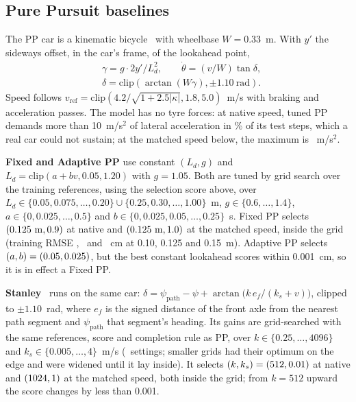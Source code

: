 \documentclass{IJCAS}
\begin{document}
\subsection{Pure Pursuit baselines}\label{sec:rlpp}
The PP car is a kinematic bicycle~\cite{rajamani2012} with wheelbase $W=0.33$~m. With $y'$ the sideways offset, in the car's frame, of the lookahead point,
\begin{equation}
\begin{aligned}
&\gamma=g\cdot2y'/L_d^2,\qquad \dot\theta=(v/W)\tan\delta,\\
&\delta=\mathrm{clip}(\arctan(W\gamma),\pm1.10~\mathrm{rad}).
\end{aligned}\label{eq:pp}
\end{equation}
Speed follows $v_{\mathrm{ref}}=\mathrm{clip}(4.2/\sqrt{1+2.5|\kappa|},1.8,5.0)$~m/s with braking and acceleration passes. The model has no tyre forces: at native speed, tuned PP demands more than 10~m/s$^2$ of lateral acceleration in \VlatAccFrac\% of its test steps, which a real car could not sustain; at the matched speed below, the maximum is \VlatAccMaxM~m/s$^2$.

\textbf{Fixed and Adaptive PP} use constant $(L_d,g)$ and $L_d=\mathrm{clip}(a+bv,0.05,1.20)$ with $g=1.05$. Both are tuned by grid search over the training references, using the selection score above, over $L_d\in\{0.05,0.075,\dots,0.20\}\cup\{0.25,0.30,\dots,1.00\}$~m, $g\in\{0.6,\dots,1.4\}$, $a\in\{0,0.025,\dots,0.5\}$ and $b\in\{0,0.025,0.05,\dots,0.25\}$~s. Fixed PP selects $(\VfixL\ \mathrm{m},\VfixG)$ at native and $(0.125\ \mathrm{m},1.0)$ at the matched speed, inside the grid (training RMSE \VtuneRa, \VtuneRb\ and \VtuneRc~cm at 0.10, 0.125 and 0.15~m). Adaptive PP selects $(a,b)=(0.05,0.025)$, but the best constant lookahead scores within 0.001~cm, so it is in effect a Fixed PP.

\textbf{Stanley}~\cite{hoffmann2007} runs on the same car: $\delta=\psi_{\mathrm{path}}-\psi+\arctan\big(k\,e_f/(k_s+v)\big)$, clipped to $\pm1.10$~rad, where $e_f$ is the signed distance of the front axle from the nearest path segment and $\psi_{\mathrm{path}}$ that segment's heading. Its gains are grid-searched with the same references, score and completion rule as PP, over $k\in\{0.25,\dots,4096\}$ and $k_s\in\{0.005,\dots,4\}$~m/s (\VstNgrid\ settings; smaller grids had their optimum on the edge and were widened until it lay inside). It selects $(k,k_s)=(512,0.01)$ at native and $(1024,1)$ at the matched speed, both inside the grid; from $k=512$ upward the score changes by less than 0.001.
\end{document}
